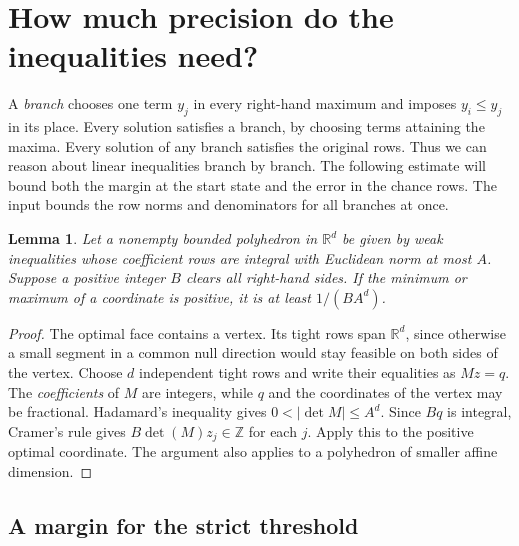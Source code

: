 \documentclass[11pt,letterpaper]{article}
\newtheorem{lemma}[theorem]{Lemma}
\begin{document}
\section{How much precision do the inequalities need?}
\label{sec:precision}

A \emph{branch} chooses one term \(y_j\) in every right-hand maximum and imposes
\(y_i\le y_j\) in its place. Every solution satisfies a branch, by choosing terms
attaining the maxima. Every solution of any branch satisfies the original rows.
Thus we can reason about linear inequalities branch by branch. The following
estimate will bound both the margin at the start state and the error in the
chance rows. The input bounds the row norms and denominators for all branches
at once.

\begin{lemma}\label{lem:vertex}
Let a nonempty bounded polyhedron in \(\mathbb R^d\) be given by weak inequalities
whose coefficient rows are integral with Euclidean norm at most \(A\). Suppose a
positive integer \(B\) clears all right-hand sides. If the minimum or maximum of a
coordinate is positive, it is at least \(1/(B A^{d})\).
\end{lemma}

\begin{proof}
The optimal face contains a vertex. Its tight rows span \(\mathbb R^d\), since
otherwise a small segment in a common null direction would stay feasible on both
sides of the vertex. Choose \(d\) independent tight rows and write their equalities
as \(Mz=q\). The \emph{coefficients} of \(M\) are integers, while \(q\) and the
coordinates of the vertex may be fractional. Hadamard's inequality gives
\(0<|\det M|\le A^d\). Since \(Bq\) is integral, Cramer's rule gives
\(B\det(M)z_j\in\mathbb Z\) for each \(j\). Apply this to the positive optimal
coordinate. The argument also applies to a polyhedron of smaller affine dimension.
\end{proof}

\subsection{A margin for the strict threshold}
\end{document}
